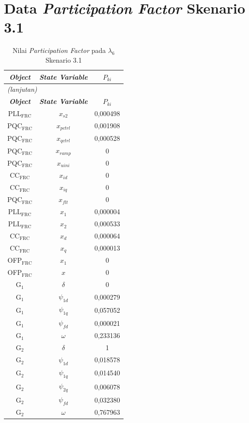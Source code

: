 \section{Data \textit{Participation Factor} Skenario 3.1}
\begingroup
\fontsize{12}{14.4}\selectfont
\setlength{\tabcolsep}{8pt}
\begin{longtable}{c c c} \caption[]{Nilai
	\textit{Participation Factor} pada $\lambda_6$ Skenario 3.1}
	\label{tab:prf_sk31_lampiran} \\
	\toprule
	\multicolumn{1}{c}{\textbf{\textit{Object}}} & \textbf{\textit{State
	Variable}} & \textbf{$P_{ki}$} \\
	\midrule
	\endfirsthead
	\multicolumn{3}{l}{\textit{(lanjutan)}} \\
	\toprule
	\multicolumn{1}{c}{\textbf{\textit{Object}}} & \textbf{\textit{State
	Variable}} & \textbf{$P_{ki}$} \\
	\midrule
	\endhead
	\bottomrule
	\endfoot
	PLL$_\text{FRC}$ & $x_{s2}$ & 0,000498 \\
	PQC$_\text{FRC}$ & $x_{pctrl}$ & 0,001908 \\
	PQC$_\text{FRC}$ & $x_{qctrl}$ & 0,000528 \\
	PQC$_\text{FRC}$ & $x_{ramp}$ & 0        \\
	PQC$_\text{FRC}$ & $x_{uini}$ & 0        \\
	CC$_\text{FRC}$ & $x_{id}$ & 0        \\
	CC$_\text{FRC}$ & $x_{iq}$ & 0        \\
	PQC$_\text{FRC}$ & $x_{flt}$ & 0        \\
	PLL$_\text{FRC}$ & $x_1$ & 0,000004 \\
	PLL$_\text{FRC}$ & $x_2$ & 0,000533 \\
	CC$_\text{FRC}$ & $x_d$ & 0,000064 \\
	CC$_\text{FRC}$ & $x_q$ & 0,000013 \\
	OFP$_\text{FRC}$ & $x_1$ & 0        \\
	OFP$_\text{FRC}$ & $x$ & 0        \\
	G$_1$ & $\delta$ & 0        \\
	G$_1$ & $\psi_{1d}$ & 0,000279 \\
	G$_1$ & $\psi_{1q}$ & 0,057052 \\
	G$_1$ & $\psi_{fd}$ & 0,000021 \\
	G$_1$ & $\omega$ & 0,233136 \\
	G$_2$ & $\delta$ & 1        \\
	G$_2$ & $\psi_{1d}$ & 0,018578 \\
	G$_2$ & $\psi_{1q}$ & 0,014540 \\
	G$_2$ & $\psi_{2q}$ & 0,006078 \\
	G$_2$ & $\psi_{fd}$ & 0,032380 \\
	G$_2$ & $\omega$ & 0,767963 \\
\end{longtable}
\par
\endgroup

